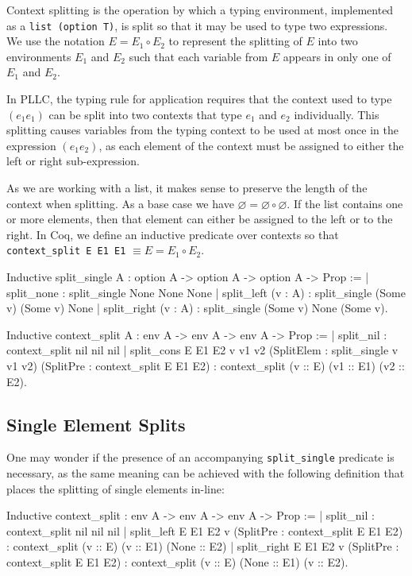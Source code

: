 \documentclass[]{unswthesis}
\let\emptyset\varnothing
\let\c\texttt
\begin{document}
Context splitting is the operation by which a typing environment, implemented as a \c{list (option T)}, is split so that it may be used to type two expressions. We use the notation $E = E_1 \circ E_2$ to represent the splitting of $E$ into two environments $E_1$ and $E_2$ such that each variable from $E$ appears in only one of $E_1$ and $E_2$.

In PLLC, the typing rule for application requires that the context used to type $(e_1 e_1)$ can be split into two contexts that type $e_1$ and $e_2$ individually. This splitting causes variables from the typing context to be used at most once in the expression $(e_1 e_2)$, as each element of the context must be assigned to either the left or right sub-expression.

As we are working with a list, it makes sense to preserve the length of the context when splitting. As a base case we have $\emptyset = \emptyset \circ \emptyset$. If the list contains one or more elements, then that element can either be assigned to the left or to the right. In Coq, we define an inductive predicate over contexts so that \c{context_split E E1 E1} $\equiv E = E_1 \circ E_2$.

\begin{coqcode}
Inductive split_single {A} : option A -> option A -> option A -> Prop :=
  | split_none : split_single None None None
  | split_left (v : A) : split_single (Some v) (Some v) None
  | split_right (v : A) : split_single (Some v) None (Some v).

Inductive context_split {A} : env A -> env A -> env A -> Prop :=
  | split_nil : context_split nil nil nil
  | split_cons E E1 E2 v v1 v2
      (SplitElem : split_single v v1 v2)
      (SplitPre : context_split E E1 E2) :
      context_split (v :: E) (v1 :: E1) (v2 :: E2).
\end{coqcode}

\subsection{Single Element Splits}

One may wonder if the presence of an accompanying \c{split_single} predicate is necessary, as the same meaning can be achieved with the following definition that places the splitting of single elements in-line:

\begin{coqcode}
Inductive context_split : env A -> env A -> env A -> Prop :=
  | split_nil : context_split nil nil nil
  | split_left E E1 E2 v
  	  (SplitPre : context_split E E1 E2) :
  	  context_split (v :: E) (v :: E1) (None :: E2)
  | split_right E E1 E2 v
  	  (SplitPre : context_split E E1 E2) :
  	  context_split (v :: E) (None :: E1) (v :: E2).
\end{coqcode}
\end{document}
